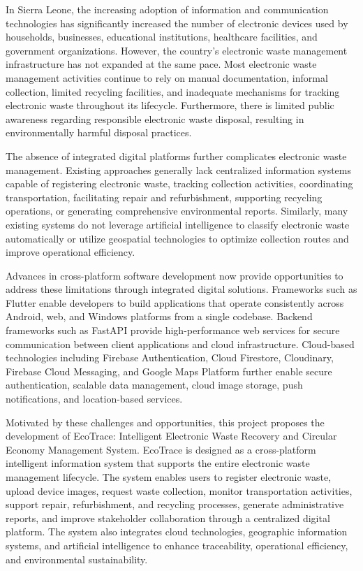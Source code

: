 In Sierra Leone, the increasing adoption of information and communication
technologies has significantly increased the number of electronic devices used by
households, businesses, educational institutions, healthcare facilities, and government
organizations. However, the country's electronic waste management infrastructure
has not expanded at the same pace. Most electronic waste management activities
continue to rely on manual documentation, informal collection, limited recycling
facilities, and inadequate mechanisms for tracking electronic waste throughout its
lifecycle. Furthermore, there is limited public awareness regarding responsible
electronic waste disposal, resulting in environmentally harmful disposal practices.

The absence of integrated digital platforms further complicates electronic waste
management. Existing approaches generally lack centralized information systems
capable of registering electronic waste, tracking collection activities, coordinating
transportation, facilitating repair and refurbishment, supporting recycling operations,
or generating comprehensive environmental reports. Similarly, many existing systems
do not leverage artificial intelligence to classify electronic waste automatically or
utilize geospatial technologies to optimize collection routes and improve operational
efficiency.

Advances in cross-platform software development now provide opportunities to
address these limitations through integrated digital solutions. Frameworks such as
Flutter enable developers to build applications that operate consistently across
Android, web, and Windows platforms from a single codebase. Backend frameworks
such as FastAPI provide high-performance web services for secure communication
between client applications and cloud infrastructure. Cloud-based technologies
including Firebase Authentication, Cloud Firestore, Cloudinary, Firebase Cloud
Messaging, and Google Maps Platform further enable secure authentication, scalable
data management, cloud image storage, push notifications, and location-based
services.

Motivated by these challenges and opportunities, this project proposes the
development of EcoTrace: Intelligent Electronic Waste Recovery and Circular
Economy Management System. EcoTrace is designed as a cross-platform intelligent
information system that supports the entire electronic waste management lifecycle.
The system enables users to register electronic waste, upload device images, request
waste collection, monitor transportation activities, support repair, refurbishment, and
recycling processes, generate administrative reports, and improve stakeholder
collaboration through a centralized digital platform. The system also integrates cloud
technologies, geographic information systems, and artificial intelligence to enhance
traceability, operational efficiency, and environmental sustainability.

